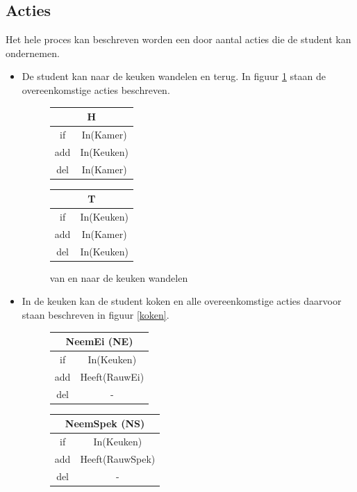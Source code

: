 \documentclass[alternative-exam.tex]{subfiles}
\begin{document}
\subsection{Acties}
Het hele proces kan beschreven worden een door aantal acties die de student kan ondernemen.
\begin{itemize}
\item
De student kan naar de keuken wandelen en terug. In figuur \ref{keuken} staan de overeenkomstige acties beschreven.
\begin{figure}[H]
\centering
\begin{tabular}{|c|c|}
    \multicolumn{2}{c}{H}\\
    \hline
    if & In(Kamer)\\
    \hline
    add & In(Keuken)\\
    \hline
    del & In(Kamer)\\
    \hline
\end{tabular}
\hspace{0.25cm}
\begin{tabular}{|c|c|}
    \multicolumn{2}{c}{T}\\
    \hline
    if & In(Keuken)\\
    \hline
    add & In(Kamer)\\
    \hline
    del & In(Keuken)\\
    \hline
\end{tabular}
\caption{van en naar de keuken wandelen}
\label{keuken}
\end{figure}
\item 
In de keuken kan de student koken en alle overeenkomstige acties daarvoor staan beschreven in figuur \ref{koken}.
\begin{figure}[H]
\centering
\begin{tabular}{|c|c|}
    \multicolumn{2}{c}{NeemEi (NE)}\\
    \hline
    if & In(Keuken)\\
    \hline
    add & Heeft(RauwEi)\\
    \hline
    del & -\\
    \hline
\end{tabular}
\hspace{0.25cm}
\begin{tabular}{|c|c|}
    \multicolumn{2}{c}{NeemSpek (NS)}\\
    \hline
    if & In(Keuken)\\
    \hline
    add & Heeft(RauwSpek)\\
    \hline
    del & -\\

\end{tabular}
\end{figure}
\end{itemize}
\end{document}
